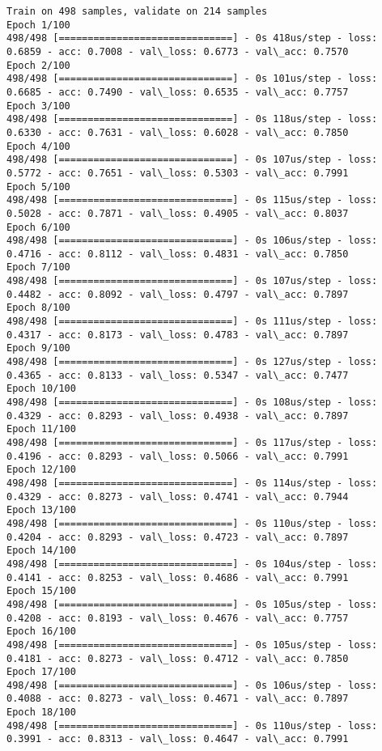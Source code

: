 \documentclass[11pt]{article}
\begin{document}
    \begin{Verbatim}[commandchars=\\\{\}]
Train on 498 samples, validate on 214 samples
Epoch 1/100
498/498 [==============================] - 0s 418us/step - loss: 0.6859 - acc: 0.7008 - val\_loss: 0.6773 - val\_acc: 0.7570
Epoch 2/100
498/498 [==============================] - 0s 101us/step - loss: 0.6685 - acc: 0.7490 - val\_loss: 0.6535 - val\_acc: 0.7757
Epoch 3/100
498/498 [==============================] - 0s 118us/step - loss: 0.6330 - acc: 0.7631 - val\_loss: 0.6028 - val\_acc: 0.7850
Epoch 4/100
498/498 [==============================] - 0s 107us/step - loss: 0.5772 - acc: 0.7651 - val\_loss: 0.5303 - val\_acc: 0.7991
Epoch 5/100
498/498 [==============================] - 0s 115us/step - loss: 0.5028 - acc: 0.7871 - val\_loss: 0.4905 - val\_acc: 0.8037
Epoch 6/100
498/498 [==============================] - 0s 106us/step - loss: 0.4716 - acc: 0.8112 - val\_loss: 0.4831 - val\_acc: 0.7850
Epoch 7/100
498/498 [==============================] - 0s 107us/step - loss: 0.4482 - acc: 0.8092 - val\_loss: 0.4797 - val\_acc: 0.7897
Epoch 8/100
498/498 [==============================] - 0s 111us/step - loss: 0.4317 - acc: 0.8173 - val\_loss: 0.4783 - val\_acc: 0.7897
Epoch 9/100
498/498 [==============================] - 0s 127us/step - loss: 0.4365 - acc: 0.8133 - val\_loss: 0.5347 - val\_acc: 0.7477
Epoch 10/100
498/498 [==============================] - 0s 108us/step - loss: 0.4329 - acc: 0.8293 - val\_loss: 0.4938 - val\_acc: 0.7897
Epoch 11/100
498/498 [==============================] - 0s 117us/step - loss: 0.4196 - acc: 0.8293 - val\_loss: 0.5066 - val\_acc: 0.7991
Epoch 12/100
498/498 [==============================] - 0s 114us/step - loss: 0.4329 - acc: 0.8273 - val\_loss: 0.4741 - val\_acc: 0.7944
Epoch 13/100
498/498 [==============================] - 0s 110us/step - loss: 0.4204 - acc: 0.8293 - val\_loss: 0.4723 - val\_acc: 0.7897
Epoch 14/100
498/498 [==============================] - 0s 104us/step - loss: 0.4141 - acc: 0.8253 - val\_loss: 0.4686 - val\_acc: 0.7991
Epoch 15/100
498/498 [==============================] - 0s 105us/step - loss: 0.4208 - acc: 0.8193 - val\_loss: 0.4676 - val\_acc: 0.7757
Epoch 16/100
498/498 [==============================] - 0s 105us/step - loss: 0.4181 - acc: 0.8273 - val\_loss: 0.4712 - val\_acc: 0.7850
Epoch 17/100
498/498 [==============================] - 0s 106us/step - loss: 0.4088 - acc: 0.8273 - val\_loss: 0.4671 - val\_acc: 0.7897
Epoch 18/100
498/498 [==============================] - 0s 110us/step - loss: 0.3991 - acc: 0.8313 - val\_loss: 0.4647 - val\_acc: 0.7991

\end{Verbatim}
\end{document}
